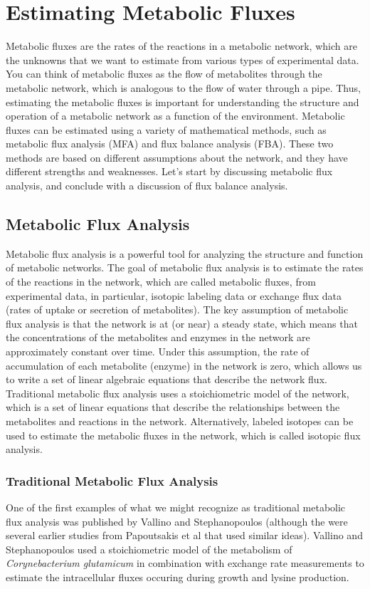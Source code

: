 \documentclass{article}[11pt]
\begin{document}
\section{Estimating Metabolic Fluxes}
Metabolic fluxes are the rates of the reactions in a metabolic network, which are the unknowns that we want to estimate from various types of experimental data.
You can think of metabolic fluxes as the flow of metabolites through the metabolic network, which is analogous to the flow of water through a pipe.
Thus, estimating the metabolic fluxes is important for understanding the structure and operation of a metabolic network as a function of the environment.
Metabolic fluxes can be estimated using a variety of mathematical methods, such as metabolic flux analysis (MFA) and flux balance analysis (FBA).
These two methods are based on different assumptions about the network, and they have different strengths and weaknesses.
Let's start by discussing metabolic flux analysis, and conclude with a discussion of flux balance analysis.

\subsection{Metabolic Flux Analysis}
Metabolic flux analysis is a powerful tool for analyzing the structure and function of metabolic networks.
The goal of metabolic flux analysis is to estimate the rates of the reactions in the network, which are called metabolic fluxes, from experimental data, in particular, isotopic labeling data or exchange flux data (rates of uptake or secretion of metabolites).
The key assumption of metabolic flux analysis is that the network is at (or near) a steady state, which means that the concentrations of the metabolites and enzymes in the network are approximately constant over time.
Under this assumption, the rate of accumulation of each metabolite (enzyme) in the network is zero, which allows us to write a set of linear algebraic equations that describe the network flux.
Traditional metabolic flux analysis uses a stoichiometric model of the network, which is a set of linear equations that describe the relationships between the metabolites and reactions in the network.
Alternatively, labeled isotopes can be used to estimate the metabolic fluxes in the network, which is called isotopic flux analysis.

\subsubsection*{Traditional Metabolic Flux Analysis}
One of the first examples of what we might recognize as traditional metabolic flux analysis was published by Vallino and Stephanopoulos \cite{Vallino:1993aa}
(although the were several earlier studies from Papoutsakis et al \cite{Papoutsakis:1985ab, Papoutsakis:1985aa} that used similar ideas).
Vallino and Stephanopoulos used a stoichiometric model of the metabolism of \textit{Corynebacterium glutamicum} in combination with exchange rate measurements to estimate the intracellular fluxes occuring during growth and lysine production.
\end{document}
